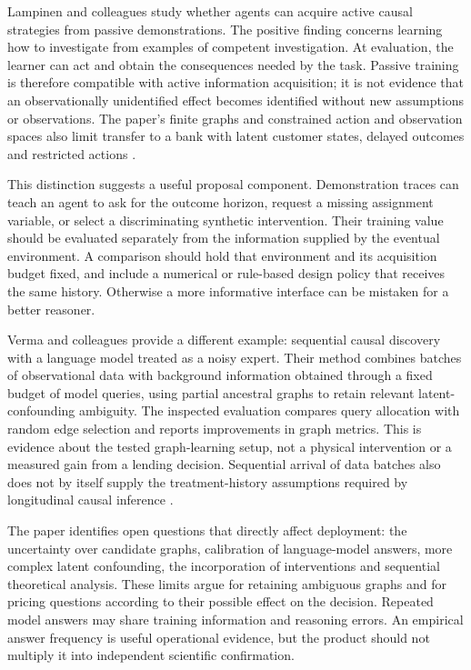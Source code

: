 Lampinen and colleagues study whether agents can acquire active causal
strategies from passive demonstrations. The positive finding concerns learning
how to investigate from examples of competent investigation. At evaluation,
the learner can act and obtain the consequences needed by the task. Passive
training is therefore compatible with active information acquisition; it is
not evidence that an observationally unidentified effect becomes identified
without new assumptions or observations. The paper's finite graphs and
constrained action and observation spaces also limit transfer to a bank with
latent customer states, delayed outcomes and restricted actions
\citep{v12_la_2305_16183}.

This distinction suggests a useful proposal component. Demonstration traces
can teach an agent to ask for the outcome horizon, request a missing
assignment variable, or select a discriminating synthetic intervention. Their
training value should be evaluated separately from the information supplied
by the eventual environment. A comparison should hold that environment and
its acquisition budget fixed, and include a numerical or rule-based design
policy that receives the same history. Otherwise a more informative interface
can be mistaken for a better reasoner.

Verma and colleagues provide a different example: sequential causal discovery
with a language model treated as a noisy expert. Their method combines batches
of observational data with background information obtained through a fixed
budget of model queries, using partial ancestral graphs to retain relevant
latent-confounding ambiguity. The inspected evaluation compares query
allocation with random edge selection and reports improvements in graph
metrics. This is evidence about the tested graph-learning setup, not a
physical intervention or a measured gain from a lending decision. Sequential
arrival of data batches also does not by itself supply the treatment-history
assumptions required by longitudinal causal inference
\citep{v12_la_2506_16234}.

The paper identifies open questions that directly affect deployment: the
uncertainty over candidate graphs, calibration of language-model answers,
more complex latent confounding, the incorporation of interventions and
sequential theoretical analysis. These limits argue for retaining ambiguous
graphs and for pricing questions according to their possible effect on the
decision. Repeated model answers may share training information and reasoning
errors. An empirical answer frequency is useful operational evidence, but
the product should not multiply it into independent scientific confirmation.

